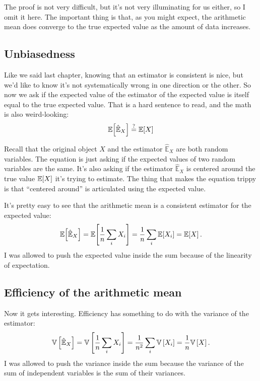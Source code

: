 The proof is not very difficult, but it's not very illuminating for us either,
so I omit it here. The important thing is that, as you might expect, the
arithmetic mean does converge to the true expected value as the amount of data
increases.

\subsection{Unbiasedness}

Like we said last chapter, knowing that an estimator is consistent is nice,
but we'd like to know it's not systematically wrong in one direction or the
other. So now we ask if the expected value of the estimator of the expected
value is itself equal to the true expected value. That is a hard sentence to
read, and the math is also weird-looking:
\begin{equation}
\mathbb{E}\!\left[{\hat{\mathbb{E}}_X}\right] \stackrel{?}{=} \mathbb{E}\!\left[{X}\right]
\end{equation}

Recall that the original object $X$ and the estimator $\hat{\mathbb{E}}_X$ are
both random variables. The equation is just asking if the expected values of
two random variables are the same. It's also asking if the estimator
$\hat{\mathbb{E}}_X$ is centered around the true value $\mathbb{E}\!\left[{X}\right]$ it's
trying to estimate. The thing that makes the equation trippy is that
``centered around'' is articulated using the expected value.

It's pretty easy to see that the arithmetic mean is a consistent estimator for the
expected value:
\begin{equation}
\mathbb{E}\!\left[{\hat{\mathbb{E}}_X}\right] = \mathbb{E}\!\left[{\frac{1}{n} \sum_i X_i}\right] = \frac{1}{n} \sum_i \mathbb{E}\!\left[{X_i}\right] = \mathbb{E}\!\left[{X}\right].
\end{equation}
I was allowed to push the expected value inside the sum because of the linearity of expectation.

\subsection{Efficiency of the arithmetic mean}

Now it gets interesting. Efficiency has something to do with the variance of
the estimator:
\begin{equation}
\mathbb{V}\left[{\hat{\mathbb{E}}_X}\right] = \mathbb{V}\left[{\frac{1}{n} \sum_i X_i}\right] = \frac{1}{n^2} \sum_i \mathbb{V}\left[{X_i}\right] = \frac{1}{n} \mathbb{V}\left[{X}\right].
\end{equation}
I was allowed to push the variance inside the sum because the variance of the
sum of independent variables is the sum of their variances.

